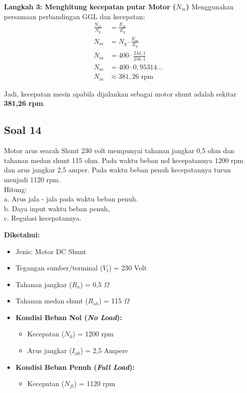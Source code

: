\documentclass[12pt, a4paper]{article}
\begin{document}
\textbf{Langkah 3: Menghitung kecepatan putar Motor ($N_m$)}
Menggunakan persamaan perbandingan GGL dan kecepatan:
\begin{align*}
    \frac{N_m}{N_g} &= \frac{E_m}{E_g} \\
    N_m &= N_g \cdot \frac{E_m}{E_g} \\
    N_m &= 400 \cdot \frac{244,1}{256,1} \\
    N_m &= 400 \cdot 0,95314... \\
    N_m &\approx 381,26 \text{ rpm}
\end{align*}

Jadi, kecepatan mesin apabila dijalankan sebagai motor shunt adalah sekitar \textbf{381,26 rpm}.

\subsection*{Soal 14}
Motor arus searah Shunt 230 volt mempunyai tahanan jangkar 0,5 ohm dan tahanan medan shunt 115 ohm. Pada waktu beban nol kecepatannya 1200 rpm dan arus jangkar 2,5 amper. Pada waktu beban penuh kecepatannya turun menjadi 1120 rpm.\\
Hitung:\\
a. Arus jala - jala pada waktu beban penuh.\\
b. Daya input waktu beban penuh,\\
c. Regulasi kecepatannya.

\textbf{Diketahui:}
\begin{itemize}
    \item Jenis: Motor DC Shunt
    \item Tegangan sumber/terminal ($V_t$) = 230 Volt
    \item Tahanan jangkar ($R_a$) = 0,5 $\Omega$
    \item Tahanan medan shunt ($R_{sh}$) = 115 $\Omega$
    \item \textbf{Kondisi Beban Nol (\textit{No Load}):}
    \begin{itemize}
        \item Kecepatan ($N_0$) = 1200 rpm
        \item Arus jangkar ($I_{a0}$) = 2,5 Ampere
    \end{itemize}
    \item \textbf{Kondisi Beban Penuh (\textit{Full Load}):}
    \begin{itemize}
        \item Kecepatan ($N_{fl}$) = 1120 rpm
    \end{itemize}
\end{itemize}
\end{document}
